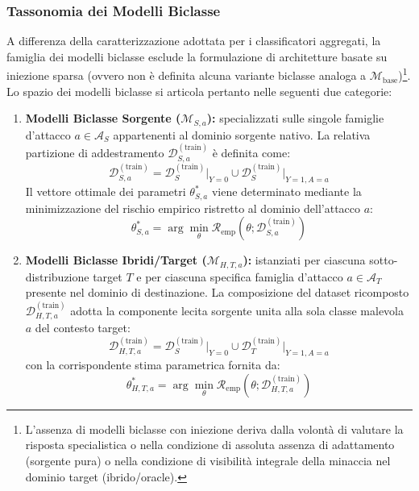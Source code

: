 \subsubsection{Tassonomia dei Modelli Biclasse}
\label{subsubsec:tassonomia_biclasse}
A differenza della caratterizzazione adottata per i classificatori aggregati, la famiglia dei modelli biclasse esclude la formulazione di architetture basate su iniezione sparsa (ovvero non è definita alcuna variante biclasse analoga a $\mathcal{M}_{\text{base}}$)\footnote{L'assenza di modelli biclasse con iniezione deriva dalla volontà di valutare la risposta specialistica o nella condizione di assoluta assenza di adattamento (sorgente pura) o nella condizione di visibilità integrale della minaccia nel dominio target (ibrido/oracle).}. Lo spazio dei modelli biclasse si articola pertanto nelle seguenti due categorie:
\begin{enumerate}
    \item \textbf{Modelli Biclasse Sorgente ($\mathcal{M}_{S, a}$):}
    specializzati sulle singole famiglie d'attacco $a \in \mathcal{A}_S$ appartenenti al dominio sorgente nativo. La relativa partizione di addestramento $\mathcal{D}_{S, a}^{(\text{train})}$ è definita come:
    \begin{equation}
        \mathcal{D}_{S, a}^{(\text{train})} = \mathcal{D}_{S}^{(\text{train})}\Big|_{Y=0} \cup \mathcal{D}_{S}^{(\text{train})}\Big|_{Y=1, A=a}
        \label{eq:ds_a_composition}
    \end{equation}
    Il vettore ottimale dei parametri $\theta_{S, a}^*$ viene determinato mediante la minimizzazione del rischio empirico ristretto al dominio dell'attacco $a$:
    \begin{equation}
        \theta_{S, a}^* = \arg\min_\theta \mathcal{R}_{\text{emp}}\left(\theta; \mathcal{D}_{S, a}^{(\text{train})}\right)
        \label{eq:ms_a_optimization}
    \end{equation}

    \item \textbf{Modelli Biclasse Ibridi/Target ($\mathcal{M}_{H, T, a}$):}
    istanziati per ciascuna sotto-distribuzione target $T$ e per ciascuna specifica famiglia d'attacco $a \in \mathcal{A}_T$ presente nel dominio di destinazione. La composizione del dataset ricomposto $\mathcal{D}_{H, T, a}^{(\text{train})}$ adotta la componente lecita sorgente unita alla sola classe malevola $a$ del contesto target:
    \begin{equation}
        \mathcal{D}_{H, T, a}^{(\text{train})} = \mathcal{D}_{S}^{(\text{train})}\Big|_{Y=0} \cup \mathcal{D}_{T}^{(\text{train})}\Big|_{Y=1, A=a}
        \label{eq:dh_a_composition}
    \end{equation}
    con la corrispondente stima parametrica fornita da:
    \begin{equation}
        \theta_{H, T, a}^* = \arg\min_\theta \mathcal{R}_{\text{emp}}\left(\theta; \mathcal{D}_{H, T, a}^{(\text{train})}\right)
        \label{eq:mh_a_optimization}
    \end{equation}
\end{enumerate}

